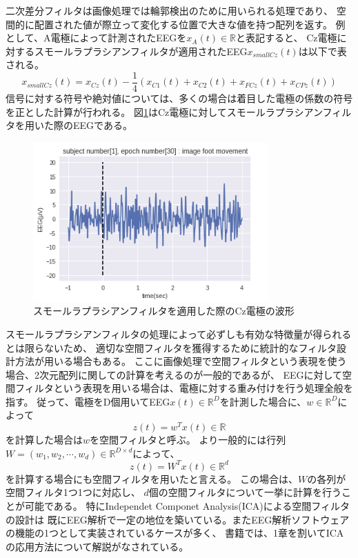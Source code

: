 二次差分フィルタは画像処理では輪郭検出のために用いられる処理であり、
空間的に配置された値が際立って変化する位置で大きな値を持つ配列を返す。
例として、A電極によって計測されたEEGを\(x_A(t) \in \mathbb R\)と表記すると、
Cz電極に対するスモールラプラシアンフィルタが適用されたEEG\(x_{smallCz}(t)\)は以下で表される。
\begin{equation}
    x_{smallCz}(t) = x_{Cz}(t) - \frac{1}{4}(x_{C1}(t) + x_{C2}(t) + x_{FCz}(t) + x_{CPz}(t))
\end{equation}
信号に対する符号や絶対値については、多くの場合は着目した電極の係数の符号を正とした計算が行われる。
図\ref{fig:Cz}はCz電極に対してスモールラプラシアンフィルタを用いた際のEEGである。
\begin{figure}[t]
    \centering
    \includegraphics[width=9cm]{images/rapCzEEG.png}
    \caption{スモールラプラシアンフィルタを適用した際のCz電極の波形}
    \label{fig:Cz}
\end{figure}
スモールラプラシアンフィルタの処理によって必ずしも有効な特徴量が得られるとは限らないため、
適切な空間フィルタを獲得するために統計的なフィルタ設計方法が用いる場合もある。
ここに画像処理で空間フィルタという表現を使う場合、2次元配列に関しての計算を考えるのが一般的であるが、
EEGに対して空間フィルタという表現を用いる場合は、電極に対する重み付けを行う処理全般を指す。
従って、電極をD個用いてEEG\(x(t) \in \mathbb R^D\)を計測した場合に、\(w \in \mathbb R^D\)によって
\begin{equation}
    z(t) = w^T x(t) \in \mathbb R
\end{equation}
を計算した場合は\(w\)を空間フィルタと呼ぶ。
より一般的には行列\(W = (w_1, w_2, \cdots, w_d) \in \mathbb R^{D \times d}\)によって、
\begin{equation}
    z(t) = W^T x(t) \in \mathbb R^d
\end{equation}
を計算する場合にも空間フィルタを用いたと言える。
この場合は、\(W\)の各列が空間フィルタ1つ1つに対応し、
\(d\)個の空間フィルタについて一挙に計算を行うことが可能である。
特にIndependet Componet Analysis(ICA)による空間フィルタの設計は
既にEEG解析で一定の地位を築いている。またEEG解析ソフトウェアの機能の1つとして実装されているケースが多く、
書籍\cite{脳波解析入門}では、1章を割いてICAの応用方法について解説がなされている。


